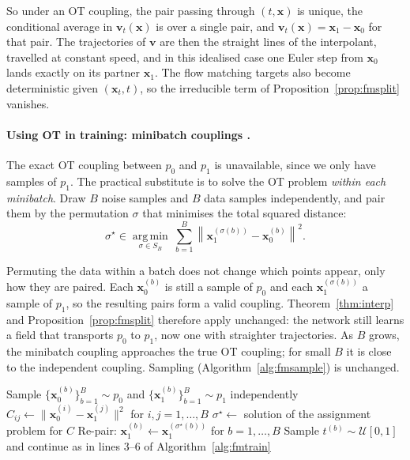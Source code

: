 \documentclass[11pt,a4paper]{article}
\numberwithin{equation}{section}     %
\theoremstyle{plain}        %
\theoremstyle{definition}   %
\theoremstyle{remark}       %
\begin{document}
So under an OT coupling, the pair passing through $(t,\mathbf{x})$ is unique, the conditional average in $\mathbf{v}_t(\mathbf{x})$ is over a single pair, and $\mathbf{v}_t(\mathbf{x})=\mathbf{x}_1-\mathbf{x}_0$ for that pair. The trajectories of $\mathbf{v}$ are then the straight lines of the interpolant, travelled at constant speed, and in this idealised case one Euler step from $\mathbf{x}_0$ lands exactly on its partner $\mathbf{x}_1$. The flow matching targets also become deterministic given $(\mathbf{x}_t,t)$, so the irreducible term of Proposition~\ref{prop:fmsplit} vanishes.

\paragraph{Using OT in training: minibatch couplings \citep{pooladian2023,tong2024}.} The exact OT coupling between $p_0$ and $p_1$ is unavailable, since we only have samples of $p_1$. The practical substitute is to solve the OT problem \emph{within each minibatch}. Draw $B$ noise samples and $B$ data samples independently, and pair them by the permutation $\sigma$ that minimises the total squared distance:
\[
\sigma^\star\in\operatorname*{arg\,min}_{\sigma\in S_B}\ \sum_{b=1}^B\left\|\mathbf{x}_1^{(\sigma(b))}-\mathbf{x}_0^{(b)}\right\|^2 .
\]

Permuting the data within a batch does not change which points appear, only how they are paired. Each $\mathbf{x}_0^{(b)}$ is still a sample of $p_0$ and each $\mathbf{x}_1^{(\sigma(b))}$ a sample of $p_1$, so the resulting pairs form a valid coupling. Theorem~\ref{thm:interp} and Proposition~\ref{prop:fmsplit} therefore apply unchanged: the network still learns a field that transports $p_0$ to $p_1$, now one with straighter trajectories. As $B$ grows, the minibatch coupling approaches the true OT coupling; for small $B$ it is close to the independent coupling. Sampling (Algorithm~\ref{alg:fmsample}) is unchanged.

\begin{algorithm}[htbp]
\caption{Flow matching with minibatch OT coupling: training}\label{alg:otfm}
\begin{algorithmic}[1]
\Repeat
\State Sample $\{\mathbf{x}_0^{(b)}\}_{b=1}^B\sim p_0$ and $\{\mathbf{x}_1^{(b)}\}_{b=1}^B\sim p_1$ independently
\State $C_{ij}\gets\|\mathbf{x}_0^{(i)}-\mathbf{x}_1^{(j)}\|^2$ for $i,j=1,\dots,B$
\State $\sigma^\star\gets$ solution of the assignment problem for $C$
\State Re-pair: $\mathbf{x}_1^{(b)}\gets\mathbf{x}_1^{(\sigma^\star(b))}$ for $b=1,\dots,B$
\State Sample $t^{(b)}\sim\mathcal{U}[0,1]$ and continue as in lines 3--6 of Algorithm~\ref{alg:fmtrain}
\end{algorithmic}
\end{algorithm}
\end{document}
